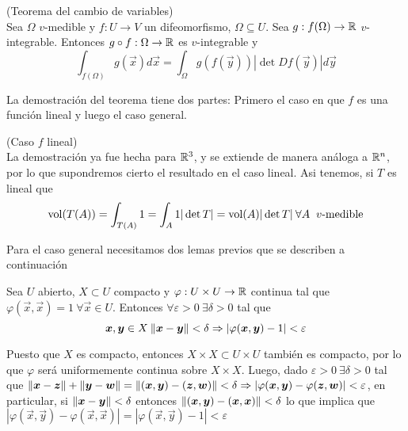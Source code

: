 \begin{teorema}\label{teo:cambioDeVariable}{\rm (Teorema del cambio de variables) }
\\Sea $\Omega$ $v$-medible y $f:U\to V$ un difeomorfismo,
$\Omega\subseteq U$. Sea $g:f(\Omega)\to \mathbb{R}$ $v$-integrable.
Entonces $g\circ f:\Omega \to \mathbb{R}$ es $v$-integrable y
\[\int_{f(\Omega)}g(\vec{x})d\vec{x}=\int_{\Omega}g(f(\vec{y}))|\det Df(\vec{y})|d\vec{y}\]
\end{teorema}

La demostraci\'on del teorema tiene dos
partes: Primero el caso en que $f$ es una funci\'on lineal y
luego el caso general.

\begin{demostracion} \hspace{2mm} (Caso $f$ lineal)
\\La demostraci\'on ya fue
hecha para $\mathbb{R}^3$, y se extiende de manera an\'aloga a $\mathbb{R}^n$,
por lo que supondremos cierto el resultado en el caso lineal. Asi
tenemos, si $T$ es lineal que
\[{\rm vol}(T(A))=\int_{T(A)}1=\int_A1|\det T|={\rm vol}(A)|\det T|\: \forall A\:{\text{ $v$-medible}}\]
\end{demostracion}

Para el caso general necesitamos dos lemas previos que se describen a continuaci\'on

\begin{lema} Sea $U$ abierto, $X\subset U$ compacto y
$\varphi:U\times U\to \mathbb{R}$ continua tal que
$\varphi(\vec{x},\vec{x})=1\:\forall \vec{x}\in U$. Entonces $\forall \varepsilon
>0\:\exists \delta >0$ tal que
\[\boldsymbol{x},\boldsymbol{y}\in X\:\lVert\boldsymbol{x}-\boldsymbol{y}\rVert<\delta\Rightarrow |\varphi(\boldsymbol{x},\boldsymbol{y})-1|<\varepsilon\]
\end{lema}

\begin{demostracion}
Puesto que $X$ es compacto, entonces $X\times
X\subset U\times U$ tambi\'en es compacto, por lo que $\varphi$
ser\'a uniformemente continua sobre $X\times X$. Luego, dado $\varepsilon
>0\:\exists\delta >0$ tal que
$\lVert\boldsymbol{x}-\boldsymbol{z}\rVert+\lVert\boldsymbol{y}-\boldsymbol{w}\rVert=\lVert(\boldsymbol{x},\boldsymbol{y})-(\boldsymbol{z},\boldsymbol{w})\rVert<\delta\Rightarrow
|\varphi(\boldsymbol{x},\boldsymbol{y})-\varphi(\boldsymbol{z},\boldsymbol{w})|<\varepsilon$, en particular, si
$\lVert\boldsymbol{x}-\boldsymbol{y}\rVert<\delta$ entonces $\lVert(\boldsymbol{x},\boldsymbol{y})-(\boldsymbol{x},\boldsymbol{x})\rVert<\delta$ lo que
implica que $|\varphi(\vec{x},\vec{y})-\varphi(\vec{x},\vec{x})|=|\varphi(\vec{x},\vec{y})-1|<\varepsilon$
\end{demostracion}

